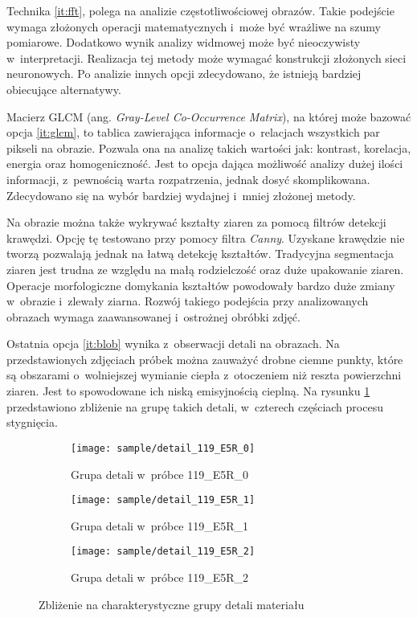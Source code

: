 Technika \ref{it:fft}, polega na analizie częstotliwościowej obrazów.
Takie podejście wymaga złożonych operacji matematycznych i~może być wrażliwe
na szumy pomiarowe.
Dodatkowo wynik analizy widmowej może być nieoczywisty w~interpretacji.
Realizacja tej metody może wymagać konstrukcji złożonych sieci neuronowych.
Po analizie innych opcji zdecydowano, że istnieją bardziej obiecujące
alternatywy.

Macierz GLCM (ang. \textit{Gray-Level Co-Occurrence Matrix}), na której może
bazować opcja \ref{it:glcm}, to tablica zawierająca informacje o~relacjach
wszystkich par pikseli na obrazie.
Pozwala ona na analizę takich wartości jak: kontrast, korelacja, energia
oraz homogeniczność.
Jest to opcja dająca możliwość analizy dużej ilości informacji, z~pewnością
warta rozpatrzenia, jednak dosyć skomplikowana.
Zdecydowano się na wybór bardziej wydajnej i~mniej złożonej metody.

Na obrazie można także wykrywać kształty ziaren za pomocą filtrów detekcji
krawędzi.
Opcję tę testowano przy pomocy filtra \emph{Canny}.
Uzyskane krawędzie nie tworzą pozwalają jednak na łatwą detekcję kształtów.
Tradycyjna segmentacja ziaren jest trudna ze względu na małą rodzielczość
oraz duże upakowanie ziaren.
Operacje morfologiczne domykania kształtów powodowały bardzo duże zmiany
w~obrazie i~zlewały ziarna.
Rozwój takiego podejścia przy analizowanych obrazach wymaga zaawansowanej
i~ostrożnej obróbki zdjęć.

Ostatnia opcja \ref{it:blob} wynika z~obserwacji detali na obrazach.
Na przedstawionych zdjęciach próbek można zauważyć drobne ciemne punkty,
które są obszarami o~wolniejszej wymianie ciepła z~otoczeniem niż reszta
powierzchni ziaren.
Jest to spowodowane ich niską emisyjnością cieplną.
Na rysunku \ref{fig:blobdetail} przedstawiono zbliżenie na grupę takich
detali, w~czterech częściach procesu stygnięcia.
\begin{figure}[htbp]
	\centering
	\begin{subfigure}{0.3\textwidth}
		\centering
		\texttt{[image: sample/detail\_119\_E5R\_0]}
		\caption{Grupa detali w~próbce 119\_E5R\_0}
	\end{subfigure}
	\hspace{0.25cm}
	\centering
	\begin{subfigure}{0.3\textwidth}
		\centering
		\texttt{[image: sample/detail\_119\_E5R\_1]}
		\caption{Grupa detali w~próbce 119\_E5R\_1}
	\end{subfigure}
	\hspace{0.24cm}
	\begin{subfigure}{0.3\textwidth}
		\centering
		\texttt{[image: sample/detail\_119\_E5R\_2]}
		\caption{Grupa detali w~próbce 119\_E5R\_2}
	\end{subfigure}
	\caption{Zbliżenie na charakterystyczne grupy detali materiału}
	\label{fig:blobdetail}
\end{figure}

